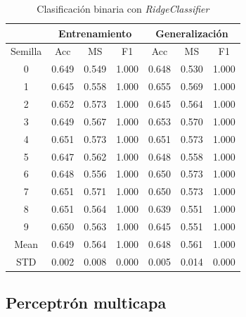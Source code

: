 \begin{table}[H]
	\centering
	\begin{tabular}{ |c|c|c|c|c|c|c| }
		\hline
		\rowcolor{LightCyan}
		 & \multicolumn{3}{c|}{Entrenamiento} & \multicolumn{3}{c|}{Generalización} \\
		\hline
		\rowcolor{LightCyan}
		 Semilla & Acc & MS & F1 & Acc & MS & F1 \\
		\hline
		0 & 0.649 & 0.549 & 1.000 & 0.648 & 0.530 & 1.000 \\
		1 & 0.645 & 0.558 & 1.000 & 0.655 & 0.569 & 1.000 \\
		2 & 0.652 & 0.573 & 1.000 & 0.645 & 0.564 & 1.000 \\
		3 & 0.649 & 0.567 & 1.000 & 0.653 & 0.570 & 1.000 \\
		4 & 0.651 & 0.573 & 1.000 & 0.651 & 0.573 & 1.000 \\
		5 & 0.647 & 0.562 & 1.000 & 0.648 & 0.558 & 1.000 \\
		6 & 0.648 & 0.556 & 1.000 & 0.650 & 0.573 & 1.000 \\
		7 & 0.651 & 0.571 & 1.000 & 0.650 & 0.573 & 1.000 \\
		8 & 0.651 & 0.564 & 1.000 & 0.639 & 0.551 & 1.000 \\
		9 & 0.650 & 0.563 & 1.000 & 0.645 & 0.551 & 1.000 \\
		Mean & 0.649 & 0.564 & 1.000 & 0.648 & 0.561 & 1.000 \\
		STD & 0.002 & 0.008 & 0.000 & 0.005 & 0.014 & 0.000 \\
		\hline
	\end{tabular}
	\caption{Clasificación binaria con \textit{RidgeClassifier}}
	\label{tabla:ridge_bin}
\end{table}


\subsection{Perceptrón multicapa}
\label{subsec:mlp_bin}

